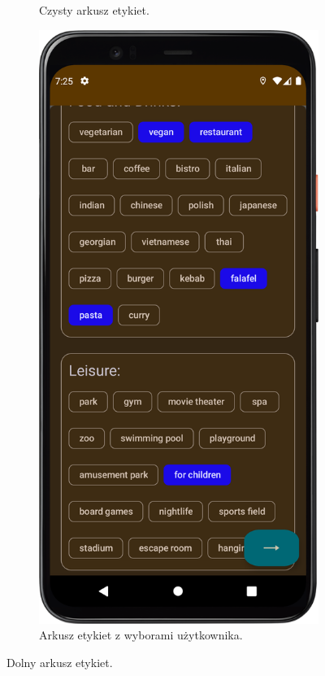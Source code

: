 \begin{figure}[H]
\begin{subfigure}[b]{0.3\textwidth}
                \caption{Czysty arkusz etykiet.\label{tags_empty}}
            \end{subfigure}
            \hfill
            \begin{subfigure}[b]{0.3\textwidth}
                \centering
                \includegraphics[width=\textwidth]{src/app/tags_selected.png}
                \caption{Arkusz etykiet z wyborami użytkownika.\label{tags_full}}
            \end{subfigure}
            \caption{Dolny arkusz etykiet.\label{tags}}
            \qquad
        \end{figure} 
        \vspace{1cm}

